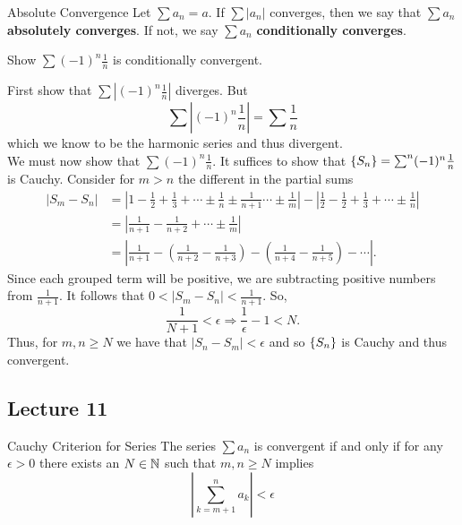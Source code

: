 \begin{defbox}{Absolute Convergence}{}
    Let $\sum a_n = a$. If $\sum |a_n|$ converges, then we say that $\sum a_n$ \textbf{absolutely converges}. If not, we say $\sum a_n$ \textbf{conditionally converges}.
\end{defbox}

\begin{example}{}{}{}
    Show $\sum (-1)^{n}\frac{1}{n}$ is conditionally convergent. 
    \begin{solution}
        First show that $\sum |(-1)^{n}\frac{1}{n}|$ diverges. But 
        \[
            \sum |(-1)^{n}\frac{1}{n}| = \sum \frac{1}{n} 
        \]
        which we know to be the harmonic series and thus divergent. \\ We must now show that $\sum (-1)^{n}\frac{1}{n}$. It suffices to show that $\left\{S_n \right\} = \sum^{n}(-1)^{n}\frac{1}{n}$ is Cauchy. Consider for $m > n$ the different in the partial sums 
        \begin{align*}
            |S_m - S_n| &= \left|1 - \frac{1}{2} + \frac{1}{3} + \cdots \pm \frac{1}{n} \pm \frac{1}{n+1} \cdots \pm \frac{1}{m}\right| - \left|\frac{1}{2} - \frac{1}{2} + \frac{1}{3} + \cdots \pm \frac{1}{n}\right| \\
            &= \left|\frac{1}{n+1} - \frac{1}{n+2} + \cdots \pm \frac{1}{m}\right| \\
            &= \left|\frac{1}{n+1} - \left(\frac{1}{n+2} - \frac{1}{n+3}\right) - \left(\frac{1}{n+4} - \frac{1}{n+5}\right) - \cdots \right|.
        \end{align*}
        Since each grouped term will be positive, we are subtracting positive numbers from $\frac{1}{n+1}$. It follows that $0 < |S_m - S_n| < \frac{1}{n+1}$. So, 
        \[
            \frac{1}{N+1} < \epsilon \Rightarrow \frac{1}{\epsilon} - 1 < N. 
        \]
        Thus, for $m, n \geq N$ we have that $|S_n - S_m| < \epsilon$ and so $\left\{S_n \right\}$ is Cauchy and thus convergent. 
    \end{solution}
\end{example}
\subsection{Lecture 11}
\begin{thm}{Cauchy Criterion for Series}
    The series $\sum a_n$ is convergent if and only if for any $\epsilon > 0$ there exists an $N \in \mathbb N$ such that $m, n \geq N$ implies 
    \[
        \left|\sum_{k=m+1}^{n} a_k\right| < \epsilon
    \]    
\end{thm}

